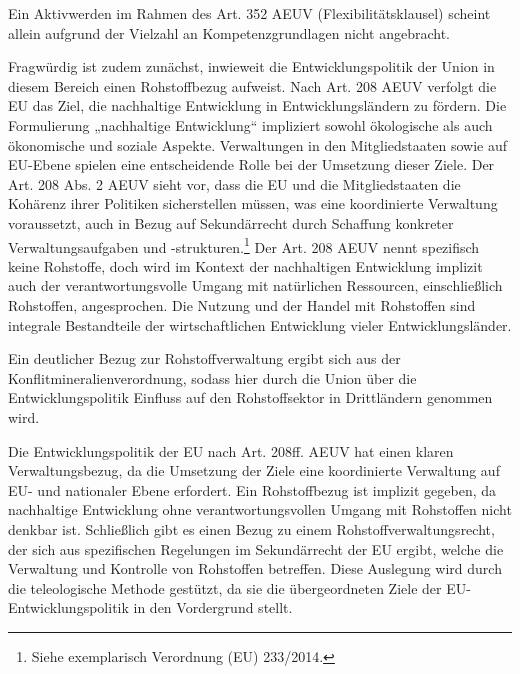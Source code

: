 \documentclass[12pt,a4paper,oneside]{book} %
\begin{document}
	Ein Aktivwerden im Rahmen des Art. 352 AEUV (\glqq Flexibilitätsklausel\grqq) scheint allein aufgrund der Vielzahl an Kompetenzgrundlagen nicht angebracht.
	
	Fragwürdig ist zudem zunächst, inwieweit die Entwicklungspolitik der Union in diesem Bereich einen Rohstoffbezug aufweist. Nach Art. 208 AEUV verfolgt die EU das Ziel, die nachhaltige Entwicklung in Entwicklungsländern zu fördern. Die Formulierung „nachhaltige Entwicklung“ impliziert sowohl ökologische als auch ökonomische und soziale Aspekte. Verwaltungen in den Mitgliedstaaten sowie auf EU-Ebene spielen eine entscheidende Rolle bei der Umsetzung dieser Ziele. Der Art. 208 Abs. 2 AEUV sieht vor, dass die EU und die Mitgliedstaaten die Kohärenz ihrer Politiken sicherstellen müssen, was eine koordinierte Verwaltung voraussetzt, auch in Bezug auf Sekundärrecht durch Schaffung konkreter Verwaltungsaufgaben und -strukturen.\footnote{Siehe exemplarisch Verordnung (EU) 233/2014.} Der Art. 208 AEUV nennt spezifisch keine Rohstoffe, doch wird im Kontext der nachhaltigen Entwicklung implizit auch der verantwortungsvolle Umgang mit natürlichen Ressourcen, einschließlich Rohstoffen, angesprochen. Die Nutzung und der Handel mit Rohstoffen sind integrale Bestandteile der wirtschaftlichen Entwicklung vieler Entwicklungsländer.
	
	Ein deutlicher Bezug zur Rohstoffverwaltung ergibt sich aus der Konflitmineralienverordnung, sodass hier durch die Union über die Entwicklungspolitik Einfluss auf den Rohstoffsektor in Drittländern genommen wird.
	
	Die Entwicklungspolitik der EU nach Art. 208ff. AEUV hat einen klaren Verwaltungsbezug, da die Umsetzung der Ziele eine koordinierte Verwaltung auf EU- und nationaler Ebene erfordert. Ein Rohstoffbezug ist implizit gegeben, da nachhaltige Entwicklung ohne verantwortungsvollen Umgang mit Rohstoffen nicht denkbar ist. Schließlich gibt es einen Bezug zu einem Rohstoffverwaltungsrecht, der sich aus spezifischen Regelungen im Sekundärrecht der EU ergibt, welche die Verwaltung und Kontrolle von Rohstoffen betreffen. Diese Auslegung wird durch die teleologische Methode gestützt, da sie die übergeordneten Ziele der EU-Entwicklungspolitik in den Vordergrund stellt.
	
\end{document}
